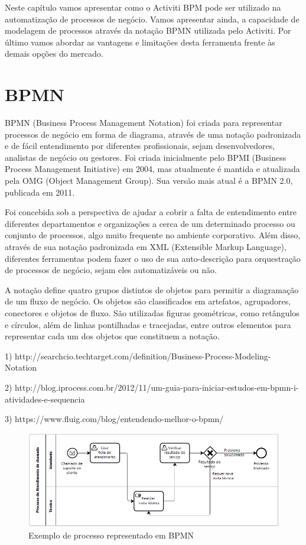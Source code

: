 Neste capítulo vamos apresentar como o Activiti BPM pode ser utilizado na automatização de processos de negócio. Vamos apresentar ainda, a capacidade de modelagem de processos através da notação BPMN utilizada pelo Activiti. Por último vamos abordar as vantagens e limitações desta ferramenta frente às demais opções do mercado.

\section{BPMN}\label{sec:LABEL_CHP_4_SEC_B}
BPMN (Business Process Management Notation) foi criada para representar processos de negócio em forma de diagrama, através de uma notação padronizada e de fácil entendimento por diferentes profissionais, sejam desenvolvedores, analistas de negócio ou gestores. Foi criada inicialmente pelo BPMI (Business Process Management Initiative) em 2004, mas atualmente é mantida e atualizada pela OMG (Object Management Group). Sua versão mais atual é a BPMN 2.0, publicada em 2011.

Foi concebida sob a perspectiva de ajudar a cobrir a falta de entendimento entre diferentes departamentos e organizações a cerca de um determinado processo ou conjunto de processos, algo muito frequente no ambiente corporativo. Além disso, através de sua notação padronizada em XML (Extensible Markup Language), diferentes ferramentas podem fazer o uso de sua auto-descrição para orquestração de processos de negócio, sejam eles automatizáveis ou não.

A notação define quatro grupos distintos de objetos para permitir a diagramação de um fluxo de negócio. Os objetos são classificados em artefatos, agrupadores, conectores e objetos de fluxo. São utilizadas figuras geométricas, como retângulos e círculos, além de linhas pontilhadas e tracejadas, entre outros elementos para representar cada um dos objetos que constituem a notação.

1) http://searchcio.techtarget.com/definition/Business-Process-Modeling-Notation

2) http://blog.iprocess.com.br/2012/11/um-guia-para-iniciar-estudos-em-bpmn-i-atividades-e-sequencia

3) https://www.fluig.com/blog/entendendo-melhor-o-bpmn/

\begin{figure}
  \centering
  \includegraphics[width=1.0\textwidth]{imagens/bpmn_example.png}
  \caption{Exemplo de processo representado em BPMN}
  \label{fig:LABEL_FIG_1}
\end{figure}

